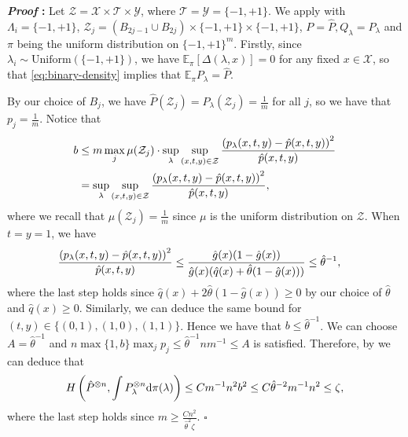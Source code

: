 \documentclass{article}
\def\gT{{\mathcal{T}}}
\def\gX{{\mathcal{X}}}
\def\gY{{\mathcal{Y}}}
\def\gZ{{\mathcal{Z}}}
\newcommand{\E}{\mathbb{E}}
\newcommand{\dd}{\textup{d}}
\renewenvironment{proof}{\noindent\textbf{\textit{Proof }:}}{\hfill$\square$}
\begin{document}
\begin{proof}
    Let $\gZ=\gX\times\gT\times\gY$, where $\gT=\gY=\{-1,+1\}$.
    We apply   with $\Lambda_i=\{-1,+1\}$, $\gZ_j = (B_{2j-1}\cup B_{2j})\times\{-1,+1\}\times\{-1,+1\}$, $P=\hat{P}, Q_{\lambda}=P_{\lambda}$ and $\pi$ being the uniform distribution on $\{-1,+1\}^m$. Firstly, since $\lambda_i\sim\mathrm{Uniform}(\{-1,+1\})$, we have $\E_{\pi}[\Delta(\lambda,x)]=0$ for any fixed $x\in\gX$, so that \eqref{eq:binary-density} implies that $\E_{\pi}P_{\lambda}=\hat{P}$.
    
    By our choice of $B_j$, we have $\hat{P}(\gZ_j)=P_{\lambda}(\gZ_j)=\frac{1}{m}$ for all $j$, so we have that $p_j=\frac{1}{m}$.  Notice that
    \begin{equation}
        \notag
        \begin{aligned}
            b &\leq m \max_j\mu(\gZ_j)\cdot\sup_{\lambda}\sup_{(x,t,y)\in\gZ} \frac{\left(p_{\lambda}(x,t,y)-\hat{p}(x,t,y)\right)^2}{\hat{p}(x,t,y)} \\
            &= \sup_{\lambda}\sup_{(x,t,y)\in\gZ} \frac{\left(p_{\lambda}(x,t,y)-\hat{p}(x,t,y)\right)^2}{\hat{p}(x,t,y)},
        \end{aligned}
    \end{equation}
    where we recall that $\mu(\gZ_j)=\frac{1}{m}$ since $\mu$ is the uniform distribution on $\gZ$. When $t=y=1$, we have
    \begin{equation}
        \notag
        \begin{aligned}
            & \frac{\left(p_{\lambda}(x,t,y)-\hat{p}(x,t,y)\right)^2}{\hat{p}(x,t,y)} \leq \frac{\hat{g}(x)(1-\hat{g}(x))}{\hat{g}(x)(\hat{q}(x)+\hat{\theta}(1-\hat{g}(x)))} \leq \hat{\theta}^{-1},
        \end{aligned}
    \end{equation}
    where the last step holds since $\hat{q}(x)+2\hat{\theta}(1-\hat{g}(x))\geq 0$ by our choice of $\hat{\theta}$ and $\hat{q}(x)\geq 0$. Similarly, we can deduce the same bound for $(t,y)\in\{(0,1),(1,0),(1,1)\}$. Hence we have that $b \leq \hat{\theta}^{-1}$. We can choose $A=\hat{\theta}^{-1}$ and $n\max\{1,b\}\max_j p_j \leq \hat{\theta}^{-1}nm^{-1}\leq A$ is satisfied. Therefore, by   we can deduce that
    \begin{equation}
        \notag
        H\left(\hat{P}^{\otimes n}, \int P_{\lambda}^{\otimes n} \dd \pi(\lambda)\right) \leq Cm^{-1}n^2b^2 \leq  C\hat{\theta}^{-2}m^{-1}n^2 \leq \zeta,
    \end{equation}
    where the last step holds since $m \geq \frac{Cn^2}{\hat{\theta}^{2}\zeta}$.
\end{proof}
\end{document}
